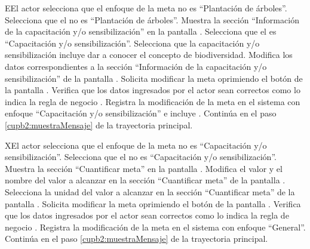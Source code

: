 \begin{UCtrayectoriaA}{E}{El actor selecciona que el enfoque de la meta no es ``Plantación de árboles''.}
	\UCpaso[\UCactor] Selecciona que el  no es ``Plantación de árboles''. 
	\UCpaso[\UCsist] Muestra la sección ``Información de la capacitación y/o sensibilización'' en la pantalla .
	\UCpaso[\UCactor] Selecciona que el  es ``Capacitación y/o sensibilización''. 
	\UCpaso[\UCactor] Selecciona que la capacitación y/o sensibilización incluye dar a conocer el concepto de biodiversidad. 
	\UCpaso[\UCactor] Modifica los datos correspondientes a la sección ``Información de la capacitación y/o sensibilización'' de la pantalla .
	\UCpaso[\UCactor] Solicita modificar la meta oprimiendo el botón  de la pantalla .  
	\UCpaso[\UCsist] Verifica que los datos ingresados por el actor sean correctos como lo indica la regla de negocio .   
	\UCpaso[\UCsist] Registra la modificación de la meta en el sistema con enfoque ``Capacitación y/o sensibilización'' e incluye .
	\UCpaso[] Continúa en el paso \ref{cupb2:muestraMensaje} de la trayectoria principal.
\end{UCtrayectoriaA}


\begin{UCtrayectoriaA}{X}{El actor selecciona que el enfoque de la meta no es ``Capacitación y/o sensibilización''.}
	\UCpaso[\UCactor] Selecciona que el  no es ``Capacitación y/o sensibilización''. 
	\UCpaso[\UCsist] Muestra la sección ``Cuantificar meta'' en la pantalla .
	\UCpaso[\UCactor] Modifica el valor y el nombre del valor a alcanzar en la sección ``Cuantificar meta'' de la pantalla .
	\UCpaso[\UCactor] Selecciona la unidad del valor a alcanzar en la sección ``Cuantificar meta'' de la pantalla . 
	\UCpaso[\UCactor] Solicita modificar la meta oprimiendo el botón  de la pantalla .  
	\UCpaso[\UCsist] Verifica que los datos ingresados por el actor sean correctos como lo indica la regla de negocio .   
	\UCpaso[\UCsist] Registra la modificación de la meta en el sistema con enfoque ``General''.
	\UCpaso[] Continúa en el paso \ref{cupb2:muestraMensaje} de la trayectoria principal.
\end{UCtrayectoriaA}

